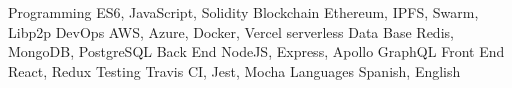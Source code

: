 


\begin{cvskills}

\cvskill
{Programming} %
{ES6, JavaScript, Solidity} %
\cvskill
{Blockchain} %
{Ethereum, IPFS, Swarm, Libp2p} %
\cvskill
{DevOps} %
{AWS, Azure, Docker, Vercel serverless} %
\cvskill
{Data Base} %
{Redis, MongoDB, PostgreSQL} %
\cvskill
{Back End} %
{NodeJS, Express, Apollo GraphQL} %
\cvskill
{Front End} %
{React, Redux} %
\cvskill
{Testing} %
{Travis CI, Jest, Mocha} %
\cvskill
{Languages} %
{Spanish, English} %
\end{cvskills}
